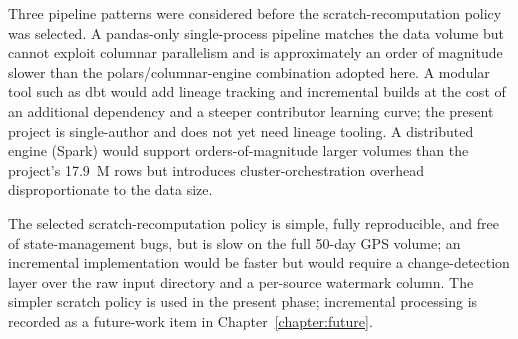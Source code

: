 Three pipeline patterns were considered before the scratch-recomputation
policy was selected. A pandas-only single-process pipeline matches the
data volume but cannot exploit columnar parallelism and is approximately
an order of magnitude slower than the polars/columnar-engine combination
adopted here. A modular tool such as dbt would add lineage tracking and
incremental builds at the cost of an additional dependency and a steeper
contributor learning curve; the present project is single-author and
does not yet need lineage tooling. A distributed engine (Spark) would
support orders-of-magnitude larger volumes than the project's 17.9~M
rows but introduces cluster-orchestration overhead disproportionate to
the data size.

The selected scratch-recomputation policy is simple, fully reproducible,
and free of state-management bugs, but is slow on the full 50-day GPS
volume; an incremental implementation would be faster but would require
a change-detection layer over the raw input directory and a per-source
watermark column. The simpler scratch policy is used in the present
phase; incremental processing is recorded as a future-work item in
Chapter~\ref{chapter:future}.
